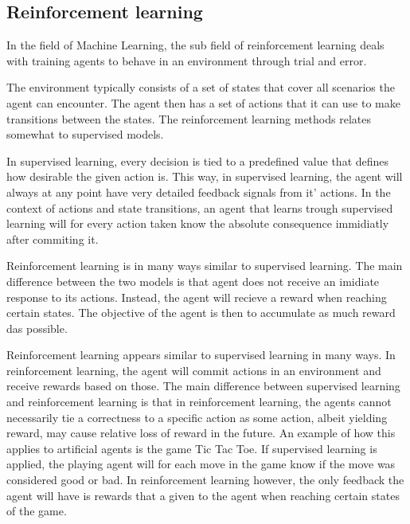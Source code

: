 \subsection{Reinforcement learning \label{RL}}

In the field of Machine Learning, the sub field of reinforcement learning
deals with training agents to behave in an environment through
trial and error.

The environment typically consists of a set of states that cover all
scenarios the agent can encounter. The agent then has a set of actions
that it can use to make transitions between the states. 
The reinforcement learning methods relates somewhat 
to supervised models.

In supervised learning, every decision is tied to a predefined value
that defines how desirable the given action is. This way, in supervised learning,
the agent will always at any point have very detailed feedback signals from it' actions.
In the context of actions and state transitions, an agent that learns trough
supervised learning will for every action taken know the absolute consequence
immidiatly after commiting it.

Reinforcement learning is in many ways similar to supervised learning. 
The main difference between the two models is that agent does not receive 
an imidiate response to its actions. Instead, the agent will recieve a reward
when reaching certain states. The objective of the agent is then to
accumulate as much reward das possible.

Reinforcement learning appears similar to supervised learning in many ways.
In reinforcement learning, the agent will commit actions in an environment
and receive rewards based on those. The main difference between supervised
learning and reinforcement learning is that in reinforcement learning,
the agents cannot necessarily tie a correctness 
to a specific action as some action, albeit yielding reward,
may cause relative loss of reward in the future. An example of how this applies 
to artificial agents is the game Tic Tac Toe. If supervised learning
is applied, the playing agent will for each move in the game know
if the move was considered good or bad. In reinforcement learning however,
the only feedback the agent will have is rewards that a given 
to the agent when reaching certain states of the game. 



